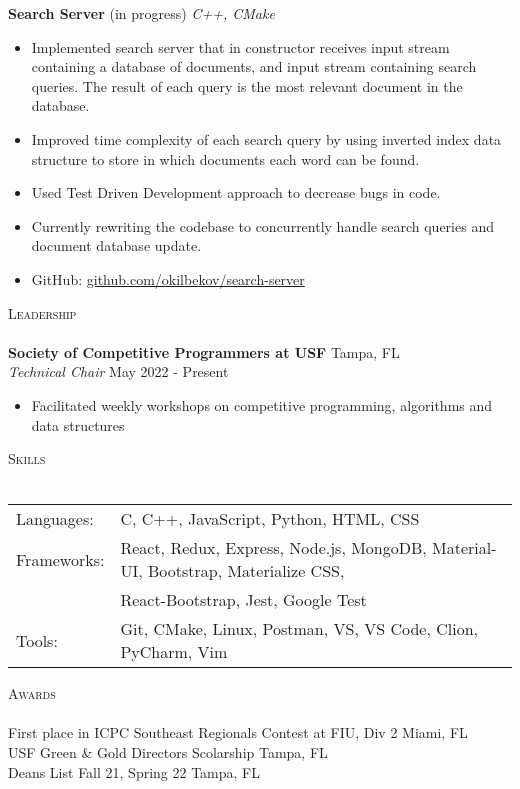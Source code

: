 \documentclass[a4paper]{article}
\newcommand{\lineunder} {
    \vspace*{-8pt} \\
    \hspace*{-18pt} \hrulefill \\
}
\newcommand{\header} [1] {
    {\hspace*{-18pt}\vspace*{6pt} \textsc{#1}}
    \vspace*{-6pt} \lineunder
}
\begin{document}
{\textbf{Search Server}} (in progress) {\sl C++, CMake} \\
\vspace{-2mm}
\begin{itemize} \itemsep 1pt
	\item Implemented search server that in constructor receives input stream containing a database of documents, and input stream containing search queries. The result of each query is the most relevant document in the database.
	\vspace{-2mm}
	\item Improved time complexity of each search query by using inverted index data structure to store in which documents each word can be found.
	\vspace{-2mm}
	\item  Used Test Driven Development approach to decrease bugs in code.
	\vspace{-2mm}
	\item Currently rewriting the codebase to concurrently handle search queries and document database update.
	\vspace{-2mm}
	\item GitHub: \href{https://github.com/okilbekov/search-server}{github.com/okilbekov/search-server}
\end{itemize}

{\Large \header{Leadership}}
\vspace{1mm}
\textbf{Society of Competitive Programmers at USF} \hfill Tampa, FL\\
\textit{Technical Chair} \hfill May 2022 - Present\\
\vspace{-1mm}
\begin{itemize} \itemsep 1pt
    \item Facilitated weekly workshops on competitive programming, algorithms and data structures
\end{itemize}
{\Large \header{Skills}}
\vspace{1mm}
\begin{tabular}{ l l }
	Languages:  & C, C++, JavaScript, Python, HTML, CSS                                                 \\
	Frameworks: & React, Redux, Express, Node.js, MongoDB, Material-UI, Bootstrap, Materialize CSS,  \\
	            & React-Bootstrap, Jest, Google Test \\
	Tools:      & Git, CMake, Linux, Postman, VS, VS Code, Clion, PyCharm, Vim                                                 \\
\end{tabular}
\vspace{2mm}

{\Large \header{Awards}}
First place in ICPC Southeast Regionals Contest at FIU, Div 2 \hfill Miami, FL\\
USF Green \& Gold Directors Scolarship \hfill Tampa, FL\\
Dean\textquotesingle{}s List Fall 21, Spring 22 \hfill Tampa, FL\\
\ 
\end{document}
